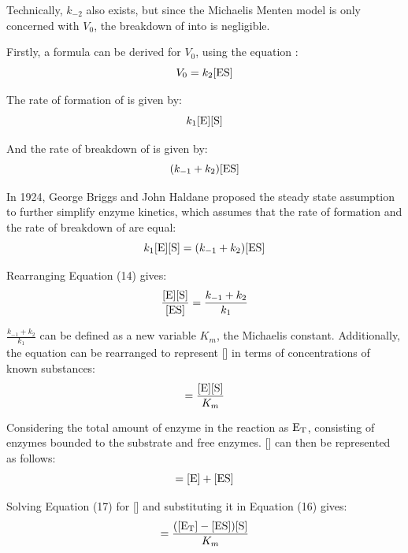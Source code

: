 \documentclass{article}
\begin{document}
\medskip

Technically, $k_{-2}$ also exists, but since the Michaelis Menten model is only concerned with $V_0$, the breakdown of  into  is negligible.

\medskip

Firstly, a formula can be derived for $V_0$, using the equation :
\begin{equation}
    V_0 = k_2[\ce{ES}]
\end{equation}

The rate of formation of  is given by:
\begin{equation}
    k_1[\ce{E}][\ce{S}]
\end{equation}

And the rate of breakdown of  is given by:
\begin{equation}
    (k_{-1} + k_2) [\ce{ES}]
\end{equation}

In 1924, George Briggs and John Haldane proposed the steady state assumption to further simplify enzyme kinetics, which assumes that the rate of formation and the rate of breakdown of  are equal:
\begin{equation}
    k_1[\ce{E}][\ce{S}] = (k_{-1} + k_2) [\ce{ES}]
\end{equation}

Rearranging Equation (14) gives:
\begin{equation}
    \frac{[\ce{E}][\ce{S}]}{[\ce{ES}]} = \frac{k_{-1}+k_2}{k_1}
\end{equation}

$\frac{k_{-1}+k_2}{k_1}$ can be defined as a new variable $K_m$, the Michaelis constant. Additionally, the equation can be rearranged to represent [] in terms of concentrations of known substances:
\begin{equation}
    [\ce{ES}] = \frac{[\ce{E}][\ce{S}]}{K_m}
\end{equation}

Considering the total amount of enzyme in the reaction as $\ce{E_T}$, consisting of enzymes bounded to the substrate and free enzymes. [] can then be represented as follows:
\begin{equation}
    [\ce{E_T}] = [\ce{E}] + [\ce{ES}]
\end{equation}

Solving Equation (17) for [] and substituting it in Equation (16) gives:
\begin{equation}
    [\ce{ES}] = \frac{([\ce{E_T}] - [\ce{ES}]) [\ce{S}]}{K_m}
\end{equation}
\end{document}
